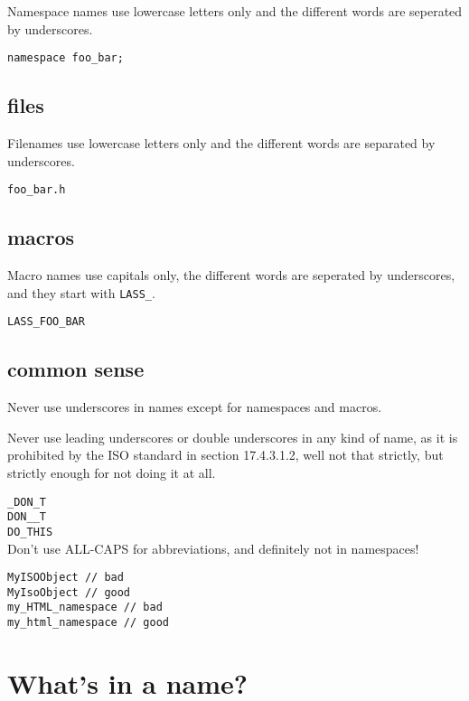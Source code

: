 \documentclass[10pt,a4paper,titlepage,dutch]{report}
\begin{document}
Namespace names use lowercase letters only and the different words
are seperated by underscores.

\verb|namespace foo_bar;|\\

\subsection{files}

Filenames use lowercase letters only and the different words are
separated by underscores.

\verb|foo_bar.h|\\

\subsection{macros}

Macro names use capitals only, the different words are seperated
by underscores, and they start with \verb|LASS_|.

\verb|LASS_FOO_BAR|\\

\subsection{common sense}

Never use underscores in names except for namespaces and macros.

Never use leading underscores or double underscores in any kind of
name, as it is prohibited by the ISO standard \cite{Cpp98}  in
section 17.4.3.1.2, well not that strictly, but strictly enough
for not doing it at all.

\verb|_DON_T|\\
\verb|DON__T|\\
\verb|DO_THIS|\\

Don't use ALL-CAPS for abbreviations, and definitely not in
namespaces!

\verb|MyISOObject // bad|\\
\verb|MyIsoObject // good|\\
\verb|my_HTML_namespace // bad|\\
\verb|my_html_namespace // good|\\

\section{What's in a name?}
\end{document}
